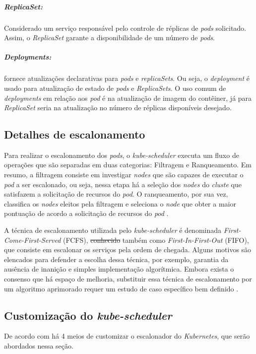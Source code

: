 \documentclass[
	12pt,				%
	openright,			%
	oneside,			%
	a4paper,			%
	brazil				%
	]{abntex2}
\providecommand{\DIFaddtex}[1]{{\protect\color{blue}\uwave{#1}}} %
\providecommand{\DIFdeltex}[1]{{\protect\color{red}\sout{#1}}}                      %
\providecommand{\DIFaddbegin}{} %
\providecommand{\DIFaddend}{} %
\providecommand{\DIFdelbegin}{} %
\providecommand{\DIFdelend}{} %
\providecommand{\DIFadd}[1]{\texorpdfstring{\DIFaddtex{#1}}{#1}} %
\providecommand{\DIFdel}[1]{\texorpdfstring{\DIFdeltex{#1}}{}} %
\newcommand{\DIFscaledelfig}{0.5}
\newlength{\DIFdelgraphicswidth} %
\newlength{\DIFdelgraphicsheight} %
\newcommand{\DIFaddincludegraphics}[2][]{{\color{blue}\fbox{\DIFOincludegraphics[#1]{#2}}}} %
\newcommand{\DIFdelincludegraphics}[2][]{%
\sbox{\DIFdelgraphicsbox}{\DIFOincludegraphics[#1]{#2}}%
\settoboxwidth{\DIFdelgraphicswidth}{\DIFdelgraphicsbox} %
\settoboxtotalheight{\DIFdelgraphicsheight}{\DIFdelgraphicsbox} %
\scalebox{\DIFscaledelfig}{%
\parbox[b]{\DIFdelgraphicswidth}{\usebox{\DIFdelgraphicsbox}\\[-\baselineskip] \rule{\DIFdelgraphicswidth}{0em}}\llap{\resizebox{\DIFdelgraphicswidth}{\DIFdelgraphicsheight}{%
\setlength{\unitlength}{\DIFdelgraphicswidth}%
\begin{picture}(1,1)%
\thicklines\linethickness{2pt} %
{\color[rgb]{1,0,0}\put(0,0){\framebox(1,1){}}}%
{\color[rgb]{1,0,0}\put(0,0){\line( 1,1){1}}}%
{\color[rgb]{1,0,0}\put(0,1){\line(1,-1){1}}}%
\end{picture}%
}\hspace*{3pt}}} %
} %
\DeclareRobustCommand{\DIFaddbegin}{\DIFOaddbegin \let\includegraphics\DIFaddincludegraphics} %
\DeclareRobustCommand{\DIFaddend}{\DIFOaddend \let\includegraphics\DIFOincludegraphics} %
\DeclareRobustCommand{\DIFdelbegin}{\DIFOdelbegin \let\includegraphics\DIFdelincludegraphics} %
\DeclareRobustCommand{\DIFdelend}{\DIFOaddend \let\includegraphics\DIFOincludegraphics} %
\begin{document}
\subparagraph{\textit{ReplicaSet}:}
Considerado um serviço responsável pelo controle de réplicas de \textit{pods} solicitado. Assim, o \textit{ReplicaSet} garante a disponibilidade de um número de \textit{pods}.

\subparagraph{\textit{Deployments}:}
fornece atualizações declarativas para \textit{pods} e \textit{replicaSets}. Ou seja, o \textit{deployment} é usado para atualização de estado de \textit{pods} e \textit{ReplicaSets}. O uso comum de \textit{deployments} em relação aos \textit{pod} é na atualização de imagem do contêiner, já para \textit{ReplicaSet} seria na atualização no número de réplicas disponíveis desejado.

\subsection{Detalhes de escalonamento}
Para realizar o escalonamento dos \textit{pods}, o \textit{kube-scheduler} executa um fluxo de operações que são separadas em duas categorias: Filtragem e Ranqueamento. Em resumo, a filtragem consiste em investigar \textit{nodes} que são capazes de executar o \textit{pod} a ser escalonado, ou seja, nessa etapa há a seleção dos \textit{nodes} do \textit{cluste} que satisfazem a solicitação de recursos do \textit{pod}. O ranqueamento, por sua vez, classifica os \textit{nodes} eleitos pela filtragem e seleciona o \textit{node} que obter a maior pontuação de acordo a solicitação de recursos do \textit{pod} \cite{Kubescheduler}.

A técnica de escalonamento utilizada pelo \textit{kube-scheduler} é denominada \textit{First-Come-First-Served} (FCFS), \DIFdelbegin \DIFdel{conhecido }\DIFdelend \DIFaddbegin \DIFadd{conhecida }\DIFaddend também como \textit{First-In-First-Out} (FIFO), que consiste em escalonar os serviços pela ordem de chegada. Alguns motivos são elencados para defender a escolha dessa técnica, por exemplo, garantia da ausência de inanição e simples implementação algorítmica. Embora exista o consenso que há espaço de melhoria, substituir essa técnica de escalonamento por um algoritmo aprimorado 
requer um estudo de caso específico bem definido \cite{CarastanSantos2019}.

\subsection{Customização do \textit{kube-scheduler}}
\label{customizacao_kube_scheduler}
De acordo com  há 4 meios de customizar o escalonador do \textit{Kubernetes}, que serão abordados nessa seção.
\end{document}
